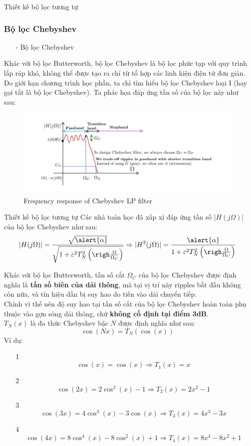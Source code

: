 \documentclass[8pt]{beamer}
\begin{document}
\begin{frame}{Thiết kế bộ lọc tương tự}
\subsubsection{Bộ lọc Chebyshev}
\begin{itemize}
	\item[-] Bộ lọc Chebyshev
\end{itemize}
Khác với bộ lọc Butterworth, bộ lọc Chebyshev \alert{là bộ lọc phức tạp} với quy trình lắp ráp khó, không thể được tạo ra chỉ từ tổ hợp các linh kiện điện tử đơn giản. Do giới hạn chương trình học phần, ta chỉ tìm hiểu bộ lọc Chebyshev loại I (hay gọi tắt là bộ lọc Chebyshev). Ta phác họa đáp ứng tần số của bộ lọc này như sau:
\begin{figure}[h]
	\includegraphics[width=1.1\textwidth]{15.jpg}
	\caption{Frequency response of Chebyshev LP filter}			\label{fig:re2}
		\end{figure}


\end{frame}
\begin{frame}{Thiết kế bộ lọc tương tự}
Các nhà toán học đã xấp xỉ đáp ứng tần số $|H(j\Omega)|$ của bộ lọc Chebyshev như sau:
$$|H(j\Omega)|=\frac{\sqrt{\alert{\alpha}}}{\sqrt{1+\varepsilon^2 T_{N}^2\left(\righ\frac{\Omega}{\Omega_{C}}\right)}}\Rightarrow |H^2(j\Omega)|=\frac{\alert{\alpha}}{1+\varepsilon^2 T_{N}^2\left(\righ\frac{\Omega}{\Omega_{C}}\right)}$$

	Khác với bộ lọc Butterworth, \alert{tần số cắt $\Omega_{C}$} của bộ lọc Chebyshev được định nghĩa là \textbf{tần số biên của dải thông}, mà tại vị trí này ripples bắt đầu không còn nữa, và tín hiệu dần bị suy hao do tiến vào dải chuyển tiếp. 
	  \\ \alert{Chính vì thế nên độ suy hao tại tần số cắt của bộ lọc Chebyshev hoàn toàn phụ thuộc vào gợn sóng dải thông, chứ \textbf{không cố định tại điểm 3dB}}.
	\\$T_{N}(x)$ là đa thức Chebyshev bậc $N$ được định nghĩa như sau: $$\cos(Nx)=T_{N}(\cos(x))$$
	Ví dụ:
\begin{enumerate}
	\item[1] $$\cos(x)=\cos(x)\Rightarrow T_{1}(x)=x$$
	\item[2] $$\cos(2x)=2\cos^2(x)-1\Rightarrow T_{2}(x)=2x^2-1$$
	\item[3] $$\cos(3x)=4\cos^3(x)-3\cos(x)\Rightarrow T_{3}(x)=4x^3-3x$$
	\item[4] $$\cos(4x)=8\cos^4(x)-8\cos^2(x)+1\Rightarrow T_{4}(x)=8x^4-8x^2+1$$
\end{enumerate}
\end{frame}
\end{document}
